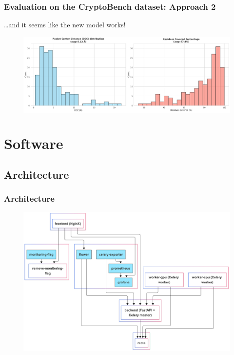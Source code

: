 \documentclass[aspectratio=169]{beamer}
\begin{document}
\begin{frame}
  \frametitle{Evaluation on the CryptoBench dataset: Approach 2}

  \dots and it seems like the new model works!

  \begin{figure}
    \includegraphics[width=\textwidth]{fig/smoothened-1.pdf}
  \end{figure}
\end{frame}

\section{Software}

\subsection{Architecture}

\begin{frame}
  \frametitle{Architecture}
  \begin{figure}
    \centering
    \includegraphics[width=\linewidth,height=0.9\textheight,keepaspectratio]{fig/architecture.png}
  \end{figure}
\end{frame}
\end{document}
